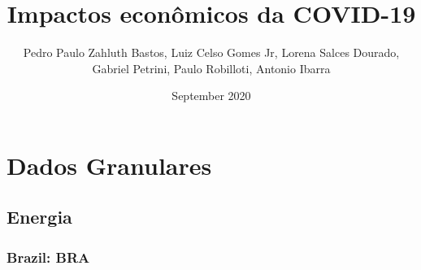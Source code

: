 \documentclass[11pt]{article}
\author{Pedro Paulo Zahluth Bastos, Luiz Celso Gomes Jr, Lorena Salces Dourado, Gabriel Petrini, Paulo Robilloti, Antonio Ibarra}
\date{September 2020}
\title{Impactos econômicos da COVID-19}
\begin{document}
\maketitle
\tableofcontents


\section{Dados Granulares}
\label{sec:org8e5023e}

\subsection{Energia}
\label{sec:org5a00f4b}



\subsubsection{Brazil: BRA}
\label{sec:org73f3c39}
\end{document}
